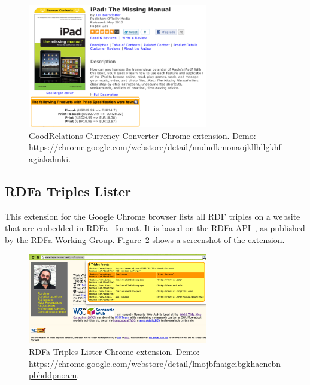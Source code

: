 \documentclass[12pt]{article}
\begin{document}
\begin{figure}[htbp!]
\begin{center}
    \includegraphics[width=0.7\textwidth]{./resources/goodrelations-currency-converter.png}
    \caption[GoodRelations Currency Converter Chrome extension.]{GoodRelations Currency Converter Chrome extension. Demo: \url{https://chrome.google.com/webstore/detail/nndndkmonaojkllhllgkhfagiakahnki}.}    
  \label{fig:goodrelations-currency-converter}
  \end{center}  
\end{figure}

\subsection{RDFa Triples Lister}
This extension for the Google Chrome browser lists all RDF triples on a website that are embedded in RDFa~\cite{ben_adida_rdfa_2008} format. It is based on the RDFa API~\cite{rdfa:api}, as published by the RDFa Working Group. Figure~\ref{fig:rdfa-triples-lister} shows a screenshot of the extension.

\begin{figure}[htbp!]
\begin{center}
    \includegraphics[width=0.7\textwidth]{./resources/rdfa-triples-lister.png}
    \caption[RDFa Triples Lister Chrome extension.]{RDFa Triples Lister Chrome extension. Demo: \url{https://chrome.google.com/webstore/detail/lmojbfnaigeibgkhacnebnpbhddpnoam}.}    
  \label{fig:rdfa-triples-lister}
  \end{center}  
\end{figure}
\end{document}
